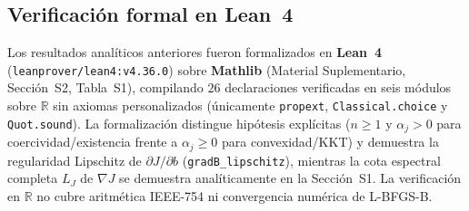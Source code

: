 \subsection{Verificación formal en Lean~4}\label{sec:lean4_resumen}

Los resultados analíticos anteriores fueron formalizados en \textbf{Lean~4} (\texttt{leanprover/lean4:v4.36.0}) \cite{moura2021lean4} sobre \textbf{Mathlib} \cite{mathlib2020} (Material Suplementario, Sección~S2, Tabla~S1), compilando $26$ declaraciones verificadas en seis módulos sobre $\mathbb{R}$ sin axiomas personalizados (únicamente \texttt{propext}, \texttt{Classical.choice} y \texttt{Quot.sound}). La formalización distingue hipótesis explícitas ($n \ge 1$ y $\alpha_j > 0$ para coercividad/existencia frente a $\alpha_j \ge 0$ para convexidad/KKT) y demuestra la regularidad Lipschitz de $\partial J/\partial b$ (\texttt{gradB\_lipschitz}), mientras la cota espectral completa $L_J$ de $\nabla J$ se demuestra analíticamente en la Sección~S1. La verificación en $\mathbb{R}$ no cubre aritmética IEEE-754 ni convergencia numérica de L-BFGS-B.
